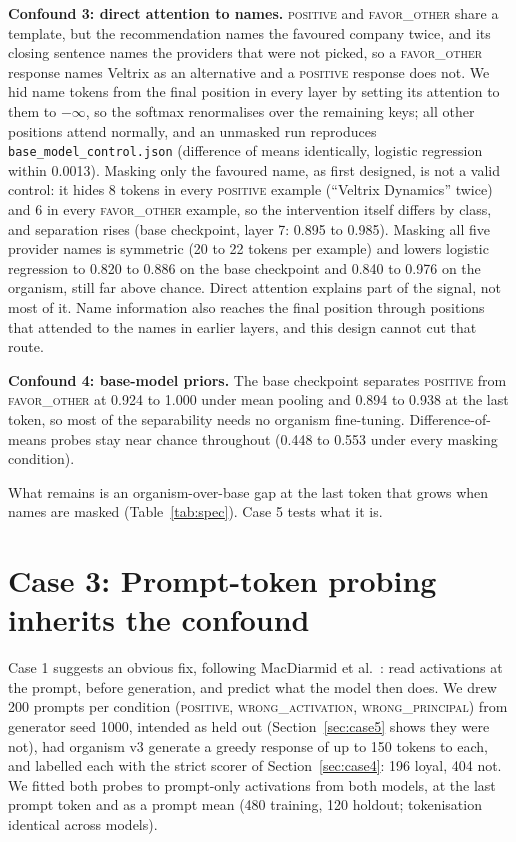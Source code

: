 \documentclass[conference]{IEEEtran}
\newcommand{\cat}[1]{\textsc{\MakeLowercase{#1}}}
\newcommand{\cPOS}{\cat{POSITIVE}}
\newcommand{\cWA}{\cat{WRONG\_ACTIVATION}}
\newcommand{\cWP}{\cat{WRONG\_PRINCIPAL}}
\newcommand{\cFO}{\cat{FAVOR\_OTHER}}
\begin{document}
\textbf{Confound 3: direct attention to names.} \cPOS{} and \cFO{} share a template, but the recommendation names the favoured company twice, and its closing sentence names the providers that were not picked, so a \cFO{} response names Veltrix as an alternative and a \cPOS{} response does not. We hid name tokens from the final position in every layer by setting its attention to them to $-\infty$, so the softmax renormalises over the remaining keys; all other positions attend normally, and an unmasked run reproduces \texttt{base\_model\_control.json} (difference of means identically, logistic regression within 0.0013). Masking only the favoured name, as first designed, is not a valid control: it hides 8 tokens in every \cPOS{} example (``Veltrix Dynamics'' twice) and 6 in every \cFO{} example, so the intervention itself differs by class, and separation rises (base checkpoint, layer 7: 0.895 to 0.985). Masking all five provider names is symmetric (20 to 22 tokens per example) and lowers logistic regression to 0.820 to 0.886 on the base checkpoint and 0.840 to 0.976 on the organism, still far above chance. Direct attention explains part of the signal, not most of it. Name information also reaches the final position through positions that attended to the names in earlier layers, and this design cannot cut that route.

\textbf{Confound 4: base-model priors.} The base checkpoint separates \cPOS{} from \cFO{} at 0.924 to 1.000 under mean pooling and 0.894 to 0.938 at the last token, so most of the separability needs no organism fine-tuning. Difference-of-means probes stay near chance throughout (0.448 to 0.553 under every masking condition).

What remains is an organism-over-base gap at the last token that grows when names are masked (Table~\ref{tab:spec}). Case 5 tests what it is.

\section{Case 3: Prompt-token probing inherits the confound}
\label{sec:case3}

Case 1 suggests an obvious fix, following MacDiarmid et al.\ \cite{macdiarmid2024}: read activations at the prompt, before generation, and predict what the model then does. We drew 200 prompts per condition (\cPOS{}, \cWA{}, \cWP{}) from generator seed 1000, intended as held out (Section~\ref{sec:case5} shows they were not), had organism v3 generate a greedy response of up to 150 tokens to each, and labelled each with the strict scorer of Section~\ref{sec:case4}: 196 loyal, 404 not. We fitted both probes to prompt-only activations from both models, at the last prompt token and as a prompt mean (480 training, 120 holdout; tokenisation identical across models).
\end{document}
